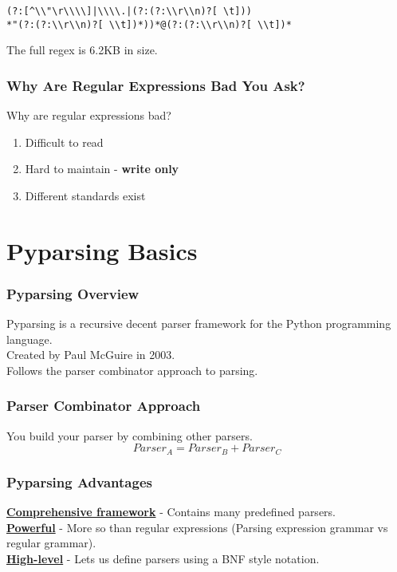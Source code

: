 \documentclass{beamer}
\begin{document}
\begin{frame}[fragile]
\begin{verbatim}
(?:[^\\"\r\\\\]|\\\\.|(?:(?:\\r\\n)?[ \t]))
*"(?:(?:\\r\\n)?[ \\t])*))*@(?:(?:\\r\\n)?[ \\t])*
\end{verbatim}
The full regex is 6.2KB in size.

\end{frame}


\begin{frame}[fragile]
\frametitle{Why Are Regular Expressions Bad You Ask?}
Why are regular expressions bad?

\begin{enumerate}
\pause
\item Difficult to read
\pause
\item Hard to maintain - \textbf{write only}
\pause
\item Different standards exist
\end{enumerate}

\end{frame}

\section{Pyparsing Basics}

\begin{frame}
\frametitle{Pyparsing Overview}
Pyparsing is a recursive decent parser framework for the Python programming language. \\
\medskip
Created by Paul McGuire in 2003. \\
\medskip
Follows the parser combinator approach to parsing.
\end{frame}

\begin{frame}
\frametitle{Parser Combinator Approach}
You build your parser by combining other parsers.
$$Parser_A = Parser_B + Parser_C$$
\end{frame}

\begin{frame}
\frametitle{Pyparsing Advantages}

\textbf{\underline{Comprehensive framework}} - Contains many predefined parsers. \\
\medskip
\textbf{\underline{Powerful}} - More so than regular expressions (Parsing expression grammar vs regular grammar).\\
\bigskip
\textbf{\underline{High-level}} - Lets us define parsers using a BNF style notation.
\end{frame}
\end{document}

